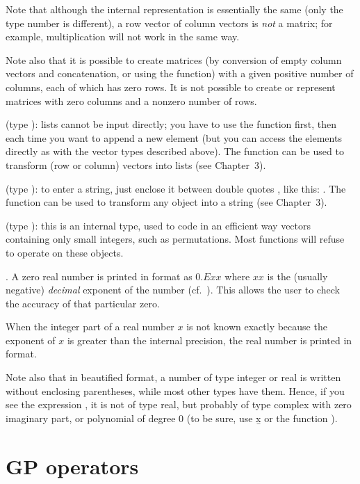 Note that although the internal representation is essentially the same (only
the type number is different), a row vector of column vectors is \emph{not} a
matrix; for example, multiplication will not work in the same way.

Note also that it is possible to create matrices (by conversion of empty
column vectors and concatenation, or using the  function) with a
given positive number of columns, each of which has zero rows. It is not
possible to create or represent matrices with zero columns and a nonzero
number of rows.

 (type ): lists cannot be input
directly; you have to use the function  first, then
 each time you want to append a new element (but you can access
the elements directly as with the vector types described above). The function
 can be used to transform (row or column) vectors into lists (see
Chapter~3).

 (type ): to
enter a string, just enclose it between double quotes , like this:
. The function  can be used to transform any
object into a string (see Chapter~3).

 (type ): this is an internal type,
used to code in an efficient way vectors containing only small integers, such
as permutations. Most  functions will refuse to operate on these
objects.

. A zero real number is printed in 
format as $0.Exx$ where $xx$ is the (usually negative) \emph{decimal}
exponent of the number (cf.~). This allows the user to
check the accuracy of that particular zero.

When the integer part of a real number $x$ is not known exactly because the
exponent of $x$ is greater than the internal precision, the real number is
printed in  format.

Note also that in beautified format, a number of type integer or real is
written without enclosing parentheses, while most other types have them.
Hence, if you see the expression , it is not of type real, but
probably of type complex with zero imaginary part, or polynomial of degree $0$
(to be sure, use \b{x} or the function ).

\section{GP operators}\label{se:operators}

